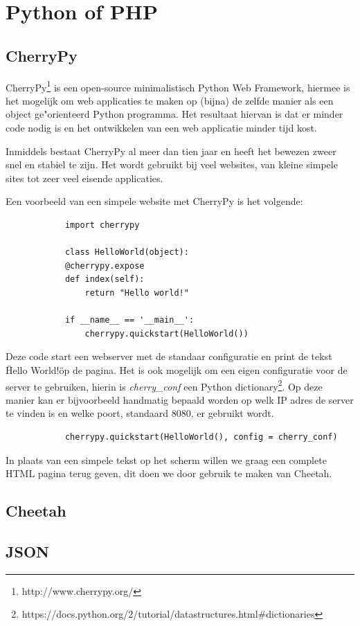 \documentclass[twoside,openright]{uva-bachelor-thesis}
\begin{document}
		\section{Python of PHP}
		\subsection{CherryPy}
			CherryPy\footnote{http://www.cherrypy.org/} is een open-source minimalistisch Python Web Framework, hiermee is het mogelijk om web applicaties te maken op (bijna) de zelfde manier als een object ge"orienteerd Python programma. Het resultaat hiervan is dat er minder code nodig is en het ontwikkelen van een web applicatie minder tijd kost.
			
			Inmiddels bestaat CherryPy al meer dan tien jaar en heeft het bewezen zweer snel en stabiel te zijn. Het wordt gebruikt bij veel websites, van kleine simpele sites tot zeer veel eisende applicaties.
			
			Een voorbeeld van een simpele website met CherryPy is het volgende:
			\begin{verbatim}
			import cherrypy
			
			class HelloWorld(object):
			@cherrypy.expose
			def index(self):
			    return "Hello world!"
			
			if __name__ == '__main__':
			    cherrypy.quickstart(HelloWorld())
			\end{verbatim}
			Deze code start een webserver met de standaar configuratie en print de tekst \"Hello World!\" op de pagina. Het is ook mogelijk om een eigen configuratie voor de server te gebruiken, hierin is \textit{cherry\_conf} een Python dictionary\footnote{https://docs.python.org/2/tutorial/datastructures.html\#dictionaries}. Op deze manier kan er bijvoorbeeld handmatig bepaald worden op welk IP adres de server te vinden is en welke poort, standaard $8080$, er gebruikt wordt. 
			\begin{verbatim}
			cherrypy.quickstart(HelloWorld(), config = cherry_conf)
			\end{verbatim}
			In plaats van een simpele tekst op het scherm willen we graag een complete HTML pagina terug geven, dit doen we door gebruik te maken van Cheetah.
		\subsection{Cheetah}
		\subsection{JSON}
\end{document}
